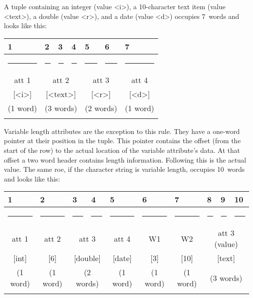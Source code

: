 \documentclass[11pt,a4paper]{report}
\begin{document}
A tuple containing an integer (value <i>), a 10-character text item
(value <text>),
a double (value <r>),
and a date (value <d>) occupies 7~words and looks like this:
 
\smallskip
{\centering\small{}
 \def\strut{\rule{0pt}{2pt}} \def\Strut{\rule{0pt}{12pt}}
 \def\fl{\multicolumn{1}{|l|}}
\begin{tabular}{|c|c|c|c|c|c|c|}
 \fl{1}&\fl{2}&\fl{3}&\fl{4}&\fl{5}&\fl{6}&\fl{7}\\
 \hline
   \rule{38pt}{0pt}&
   \rule{38pt}{0pt}&
   \rule{38pt}{0pt}&
   \rule{38pt}{0pt}&
   \rule{38pt}{0pt}&
   \rule{38pt}{0pt}&
   \rule{38pt}{0pt}\\
 \Strut att 1&
 \multicolumn{3}{|c|}{att 2}&
 \multicolumn{2}{|c|}{att 3}&
 att 4\\
 \Strut [<i>]&
 \multicolumn{3}{|c|}{[<text>]}&
 \multicolumn{2}{|c|}{[<r>]}&
 [<d>]\\
 \Strut (1 word)&
 \multicolumn{3}{|c|}{(3 words)}&
 \multicolumn{2}{|c|}{(2 words)}&
 (1 word)\\
 &&&&&&\\
 \hline
\end{tabular}
 \par}
 
\medskip
Variable length attributes are the exception to this rule.
They have a one-word pointer at their position in the tuple.
This pointer contains the offset (from the start of the row)
to the actual location of the variable attribute's data.
At that offset a two word header contains length information.
Following this is the actual value.
The same roe, if the character string is variable length,
occupies 10~words and
looks like this:
 
\smallskip
{\centering\small{}
 \def\strut{\rule{0pt}{2pt}} \def\Strut{\rule{0pt}{12pt}}
 \def\fl{\multicolumn{1}{|l|}}
\begin{tabular}{|c|c|c|c|c|c|c|c|c|c|}
 \fl{1}&\fl{2}&\fl{3}&\fl{4}&\fl{5}&\fl{6}&\fl{7}&\fl{8}&\fl{9}&\fl{10}\\
 \hline
   \rule{25pt}{0pt}&
   \rule{25pt}{0pt}&
   \rule{25pt}{0pt}&
   \rule{25pt}{0pt}&
   \rule{25pt}{0pt}&
   \rule{25pt}{0pt}&
   \rule{25pt}{0pt}&
   \rule{25pt}{0pt}&
   \rule{25pt}{0pt}&
   \rule{25pt}{0pt}\\
 \Strut att 1&
 att 2&
 \multicolumn{2}{|c|}{att 3}&
 att 4&
  W1 &
  W2 &
  \multicolumn{3}{|c|}{att 3 (value)}\\
 \Strut [int]&
 [6]&
 \multicolumn{2}{|c|}{[double]}&
 [date]&
   [3]&
   [10]&
   \multicolumn{3}{|c|}{[text]}\\
 \Strut (1 word)&
 (1 word)&
 \multicolumn{2}{|c|}{(2 words)}&
 (1 word)&
  (1 word)&
  (1 word)&
  \multicolumn{3}{|c|}{(3 words)}\\
  &&&&&&&&&\\
 \hline
\end{tabular}
\par}
 
\end{document}
